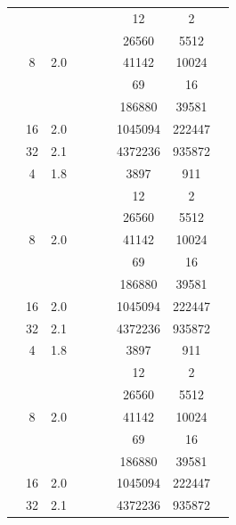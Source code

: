 \begin{table}[htbp]
\begin{tabular}{l S[table-format=3.0] S[table-format=4.1] l S[table-format=6.0] S[table-format=6.0] S[table-format=6.0] S[table-format=5.0] S[table-format=2.0]}
     &  &  &  & {\text{---}} & {\text{---}} & 12 & 2 & {\text{---}} \\
     &  &  &  & {\text{---}} & {\text{---}} & 26560 & 5512 & {\text{---}} \\
     & 8 & 2.0 &  & {\text{---}} & {\text{---}} & 41142 & 10024 & {\text{---}} \\
     &  &  &  & {\text{---}} & {\text{---}} & 69 & 16 & {\text{---}} \\
     &  &  &  & {\text{---}} & {\text{---}} & 186880 & 39581 & {\text{---}} \\
     & 16 & 2.0 &  & {\text{---}} & {\text{---}} & 1045094 & 222447 & {\text{---}} \\
     & 32 & 2.1 &  & {\text{---}} & {\text{---}} & 4372236 & 935872 & {\text{---}} \\
    \midrule
     & 4 & 1.8 &  & {\text{---}} & {\text{---}} & 3897 & 911 & {\text{---}} \\
     &  &  &  & {\text{---}} & {\text{---}} & 12 & 2 & {\text{---}} \\
     &  &  &  & {\text{---}} & {\text{---}} & 26560 & 5512 & {\text{---}} \\
     & 8 & 2.0 &  & {\text{---}} & {\text{---}} & 41142 & 10024 & {\text{---}} \\
     &  &  &  & {\text{---}} & {\text{---}} & 69 & 16 & {\text{---}} \\
     &  &  &  & {\text{---}} & {\text{---}} & 186880 & 39581 & {\text{---}} \\
     & 16 & 2.0 &  & {\text{---}} & {\text{---}} & 1045094 & 222447 & {\text{---}} \\
     & 32 & 2.1 &  & {\text{---}} & {\text{---}} & 4372236 & 935872 & {\text{---}} \\
    \midrule
     & 4 & 1.8 &  & {\text{---}} & {\text{---}} & 3897 & 911 & {\text{---}} \\
     &  &  &  & {\text{---}} & {\text{---}} & 12 & 2 & {\text{---}} \\
     &  &  &  & {\text{---}} & {\text{---}} & 26560 & 5512 & {\text{---}} \\
     & 8 & 2.0 &  & {\text{---}} & {\text{---}} & 41142 & 10024 & {\text{---}} \\
     &  &  &  & {\text{---}} & {\text{---}} & 69 & 16 & {\text{---}} \\
     &  &  &  & {\text{---}} & {\text{---}} & 186880 & 39581 & {\text{---}} \\
     & 16 & 2.0 &  & {\text{---}} & {\text{---}} & 1045094 & 222447 & {\text{---}} \\
     & 32 & 2.1 &  & {\text{---}} & {\text{---}} & 4372236 & 935872 & {\text{---}} \\
    \bottomrule
  \end{tabular}
\end{table}
